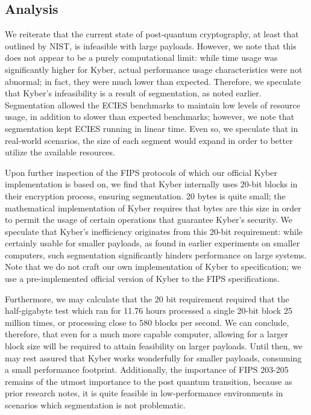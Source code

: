 \documentclass[a4paper]{article}
\begin{document}
\subsection{Analysis}
We reiterate that the current state of post-quantum
cryptography, at least that outlined by NIST, is infeasible with large
payloads. However, we note that this does not appear to be a purely
computational limit: while time usage was significantly higher for
Kyber, actual performance usage characteristics were not abnormal; in
fact, they were much lower than expected. Therefore, we speculate that
Kyber's infeasibility is a result of segmentation, as noted earlier.
Segmentation allowed the ECIES benchmarks to maintain low levels of
resource usage, in addition to slower than expected benchmarks; however,
we note that segmentation kept ECIES running in linear time. Even so, we
speculate that in real-world scenarios, the size of each segment would
expand in order to better utilize the available resources.

Upon further inspection of the FIPS protocols of which our official
Kyber implementation is based on, we find that Kyber internally uses
20-bit blocks in their encryption process, ensuring segmentation. 20
bytes is quite small; the mathematical implementation of Kyber requires
that bytes are this size in order to permit the usage of certain
operations that guarantee Kyber's security. We speculate that Kyber's
inefficiency originates from this 20-bit requirement: while certainly
usable for smaller payloads, as found in earlier experiments on smaller
computers, such segmentation significantly hinders performance on large
systems. Note that we do not craft our own implementation of Kyber to
specification; we use a pre-implemented official version of Kyber to the
FIPS specifications.

Furthermore, we may calculate that the 20 bit requirement required that
the half-gigabyte test which ran for 11.76 hours processed a single
20-bit block 25 million times, or processing close to 580 blocks per
second. We can conclude, therefore, that even for a much more capable
computer, allowing for a larger block size will be required to attain
feasibility on larger payloads. Until then, we may rest assured that
Kyber works wonderfully for smaller payloads, consuming a small
performance footprint. Additionally, the importance of FIPS 203-205
remains of the utmost importance to the post quantum transition, because
as prior research notes, it is quite feasible in low-performance
environments in scenarios which segmentation is not problematic.
\end{document}
